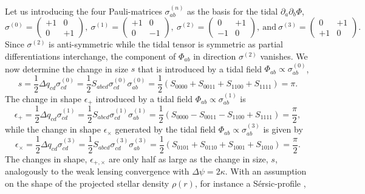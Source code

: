 \documentclass[a4paper,fleqn,usenatbib]{mnras}
\begin{document}
Let us introducing the four Pauli-matrices $\sigma^{(n)}_{ab}$ as the basis for the tidal $\partial_a\partial_b\Phi$,
\begin{equation}
\sigma^{(0)} = \left(
\begin{array}{cc}
+1 & 0 \\ 0 & +1
\end{array}
\right),~
\sigma^{(1)} = \left(
\begin{array}{cc}
+1 & 0 \\ 0 & -1
\end{array}
\right),~
\sigma^{(2)} = \left(
\begin{array}{cc}
0 & +1 \\ -1 & 0
\end{array}
\right),
\mathrm{~and~}
\sigma^{(3)} = \left(
\begin{array}{cc}
0 & +1 \\ +1 & 0
\end{array}
\right).
\end{equation}
Since $\sigma^{(2)}$ is anti-symmetric while the tidal tensor is symmetric as partial differentiations interchange, the component of $\Phi_{ab}$ in direction $\sigma^{(2)}$ vanishes. We now determine the change in size $s$ that is introduced by a tidal field $\Phi_{ab}\propto\sigma_{ab}^{(0)}$,
\begin{equation}
s = 
\frac{1}{2}\Delta q_{cd}\sigma^{(0)}_{cd} = 
\frac{1}{2}S_{abcd}\sigma^{(0)}_{cd}\sigma^{(0)}_{ab} = 
\frac{1}{2}\left(S_{0000} + S_{0011} + S_{1100} + S_{1111}\right) = 
\pi.
\end{equation}
The change in shape $\epsilon_+$ introduced by a tidal field $\Phi_{ab}\propto\sigma^{(1)}_{ab}$ is
\begin{equation}
\epsilon_+ = 
\frac{1}{2}\Delta q_{cd}\sigma^{(1)}_{cd} = 
\frac{1}{2}S_{abcd}\sigma^{(1)}_{cd}\sigma^{(1)}_{ab} = 
\frac{1}{2}\left(S_{0000} - S_{0011} - S_{1100} + S_{1111}\right) =
\frac{\pi}{2},
\end{equation}
while the change in shape $\epsilon_\times$ generated by the tidal field $\Phi_{ab}\propto\sigma^{(3)}_{ab}$ is given by
\begin{equation}
\epsilon_\times = 
\frac{1}{2}\Delta q_{cd}\sigma^{(3)}_{cd} =
\frac{1}{2}S_{abcd}\sigma^{(3)}_{cd}\sigma^{(3)}_{ab} = 
\frac{1}{2}\left(S_{0101} + S_{0110} + S_{1001} + S_{1010}\right) = 
\frac{\pi}{2}.
\end{equation}
The changes in shape, $\epsilon_{+,\times}$ are only half as large as the change in size, $s$, analogously to the weak lensing convergence with $\Delta\psi = 2\kappa$. With an assumption on the shape of the projected stellar density $\rho(r)$, for instance a S{\'e}rsic-profile \citep{sersic_influence_1963, graham_concise_2005},
\end{document}
